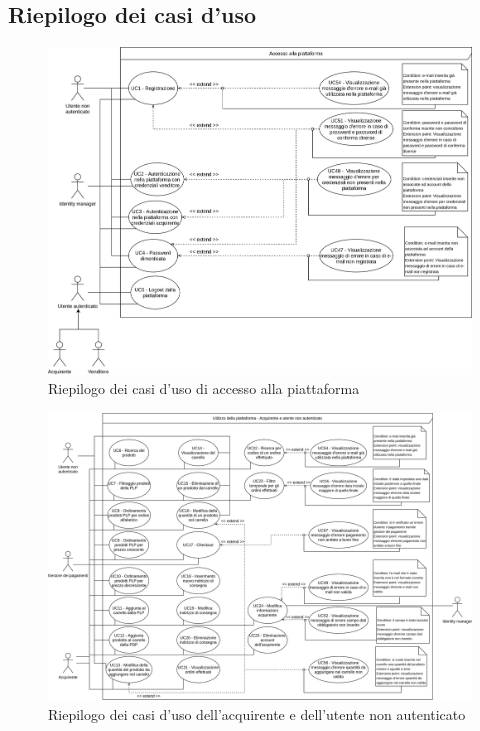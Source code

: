 \subsection{Riepilogo dei casi d'uso}

\begin{figure}[H]
    \centering
    \includegraphics[scale=0.42]{Immagini/DiagrammiUC/AccessoAllaPiattaforma.png}
    \caption{Riepilogo dei casi d'uso di accesso alla piattaforma} 
    \label{fig:riepilogo-accesso-alla-piattaforma}
\end{figure}

\begin{figure}[H]
    \centering
    \includegraphics[width=\textwidth]{Immagini/DiagrammiUC/UsoPiattaformaAcquirenteUtenteNonAutenticato.png}
    \caption{Riepilogo dei casi d'uso dell'acquirente e dell'utente non autenticato}
    \label{fig:uso-piattaforma-acquirente-utente-non-autenticato}
\end{figure}

